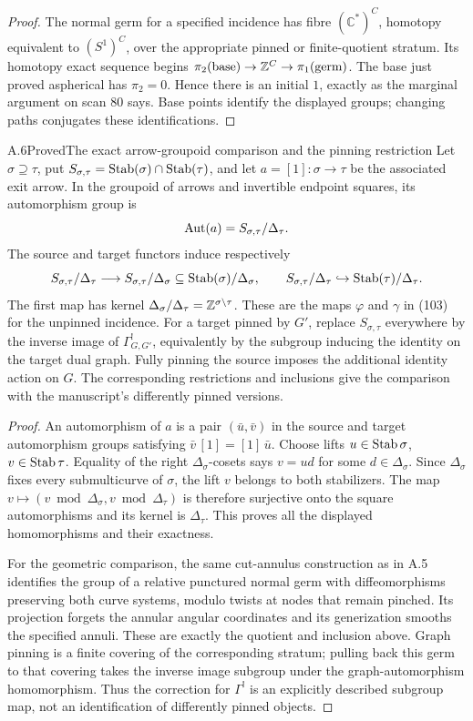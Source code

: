 \begin{proof}
The normal germ for a specified incidence has fibre $(\mathbb C^*)^C$, homotopy equivalent to $(S^1)^C$, over the appropriate pinned or finite-quotient stratum. Its homotopy exact sequence begins $\pi_2(\text{base})\to\mathbb Z^C\to\pi_1(\text{germ})$. The base just proved aspherical has $\pi_2=0$. Hence there is an initial $1$, exactly as the marginal argument on scan 80 says. Base points identify the displayed groups; changing paths conjugates these identifications.
\end{proof}

\begin{result}{A.6}{Proved}{The exact arrow-groupoid comparison and the pinning restriction}
Let $\sigma\supseteq\tau$, put $S_{\sigma,\tau}=\operatorname{Stab}(\sigma)\cap\operatorname{Stab}(\tau)$, and let $a=[1]:\sigma\to\tau$ be the associated exit arrow. In the groupoid of arrows and invertible endpoint squares, its automorphism group is
\[
 \operatorname{Aut}(a)=S_{\sigma,\tau}/\Delta_\tau.
\]
The source and target functors induce respectively
\[
 S_{\sigma,\tau}/\Delta_\tau\longrightarrow
 S_{\sigma,\tau}/\Delta_\sigma\subseteq\operatorname{Stab}(\sigma)/\Delta_\sigma,
 \qquad
 S_{\sigma,\tau}/\Delta_\tau\hookrightarrow\operatorname{Stab}(\tau)/\Delta_\tau.
\]
The first map has kernel $\Delta_\sigma/\Delta_\tau=\mathbb Z^{\sigma\setminus\tau}$. These are the maps $\varphi$ and $\gamma$ in (103) for the unpinned incidence. For a target pinned by $G'$, replace $S_{\sigma,\tau}$ everywhere by the inverse image of $\Gamma^!_{G,G'}$, equivalently by the subgroup inducing the identity on the target dual graph. Fully pinning the source imposes the additional identity action on $G$. The corresponding restrictions and inclusions give the comparison with the manuscript's differently pinned versions.
\end{result}
\begin{proof}
An automorphism of $a$ is a pair $(\bar u,\bar v)$ in the source and target automorphism groups satisfying $\bar v\,[1]=[1]\,\bar u$. Choose lifts $u\in\operatorname{Stab}\sigma$, $v\in\operatorname{Stab}\tau$. Equality of the right $\Delta_\sigma$-cosets says $v=u d$ for some $d\in\Delta_\sigma$. Since $\Delta_\sigma$ fixes every submulticurve of $\sigma$, the lift $v$ belongs to both stabilizers. The map $v\mapsto(v\bmod\Delta_\sigma,v\bmod\Delta_\tau)$ is therefore surjective onto the square automorphisms and its kernel is $\Delta_\tau$. This proves all the displayed homomorphisms and their exactness.

For the geometric comparison, the same cut-annulus construction as in A.5 identifies the group of a relative punctured normal germ with diffeomorphisms preserving both curve systems, modulo twists at nodes that remain pinched. Its projection forgets the annular angular coordinates and its generization smooths the specified annuli. These are exactly the quotient and inclusion above. Graph pinning is a finite covering of the corresponding stratum; pulling back this germ to that covering takes the inverse image subgroup under the graph-automorphism homomorphism. Thus the correction for $\Gamma^!$ is an explicitly described subgroup map, not an identification of differently pinned objects.
\end{proof}

